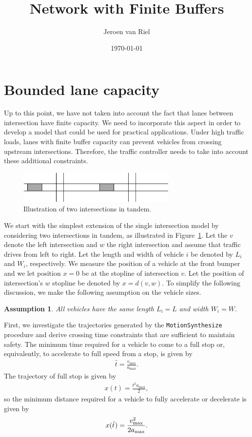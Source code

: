 \documentclass[a4paper]{article}
\title{Network with Finite Buffers}
\author{Jeroen van Riel}
\date{\monthyeardate\today}
\theoremstyle{definition}
\theoremstyle{plain}
\newtheorem{assump}{Assumption}
\begin{document}
\section*{Bounded lane capacity}

Up to this point, we have not taken into account the fact that lanes between
intersection have finite capacity. We need to incorporate this aspect in order
to develop a model that could be used for practical applications. Under high
traffic loads, lanes with finite buffer capacity can prevent vehicles from
crossing upstream intersections. Therefore, the traffic controller needs to take
into account these additional constraints.

\begin{figure}[h]
  \centering
  \includegraphics[width=0.7\textwidth]{figures/tandem.pdf}
  \caption{Illustration of two intersections in tandem.}\label{fig:tandem}
\end{figure}



We start with the simplest extension of the single intersection model by
considering two intersections in tandem, as illustrated in Figure~\ref{fig:tandem}. Let the
$v$ denote the left intersection and $w$ the right intersection and assume that
traffic drives from left to right. Let the length and width of vehicle $i$ be
denoted by $L_{i}$ and $W_{i}$, respectively. We measure the position of a
vehicle at the front bumper and we let position $x=0$ be at the stopline of
intersection $v$. Let the position of intersection's $w$ stopline be denoted by
$x=d(v,w)$. To simplify the following discussion, we make the following
assumption on the vehicle sizes.
\begin{assump}
  \label{assump:vehicle_geometry}
  All vehicles have the same length $L_{i} = L$ and width
  $W_{i} = W$.
\end{assump}

First, we investigate the trajectories generated by the
\texttt{MotionSynthesize} procedure and derive crossing time constraints that
are sufficient to maintain safety.
%
The minimum time required for a vehicle to come to a full stop or, equivalently,
to accelerate to full speed from a stop, is given by
\begin{align*}
  \hat{t} = \frac{v_{\max}}{a_{\max}} .
\end{align*}
The trajectory of full stop is given by
\begin{align*}
  x(t) = \frac{t^{2} a_{\max}}{2} ,
\end{align*}
so the minimum distance required for a vehicle to fully accelerate or decelerate
is given by
\begin{align*}
  x(\hat{t} \hspace{0.06em}) = \frac{v_{\max}^{2}}{2 a_{\max}} .
\end{align*}
\end{document}
